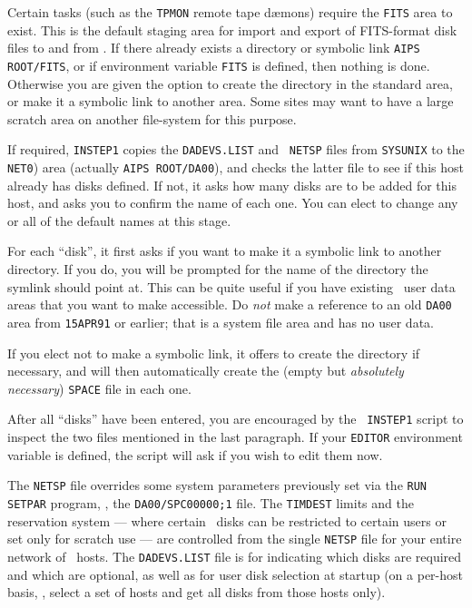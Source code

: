 Certain tasks (such as the {\tt TPMON} remote tape d\ae mons) require the
{\tt FITS} area to exist.  This is the default staging area for import and
export of FITS-format disk files to and from \ttaips.  If there already
exists a directory or symbolic link {\tt\dol AIPS ROOT/FITS}, or if
environment variable {\tt\dol FITS} is defined, then nothing is done.
Otherwise you are given the option to create the directory in the standard
area, or make it a symbolic link to another area.  Some sites may want to
have a large scratch area on another file-system for this purpose.

If required, {\tt INSTEP1} copies the {\tt DADEVS.LIST} and {\tt
NETSP} files from {\tt\dol SYSUNIX} to the {\tt\dol NET0}) area
(actually {\tt\dol AIPS ROOT/DA00}), and checks the latter file to
see if this host already has disks defined.  If not, it asks how many
disks are to be added for this host, and asks you to confirm the name of
each one.  You can elect to change any or all of the default names at this
stage.

For each ``disk'', it first asks if you want to make it a symbolic link
to another directory.  If you do, you will be prompted for the name of
the directory the symlink should point at.  This can be quite useful if
you have existing \AIPS\ user data areas that you want to make
accessible.  Do {\it not\/} make a reference to an old {\tt DA00} area
from {\tt 15APR91} or earlier; that is a system file area and has no
user data.

If you elect not to make a symbolic link, it offers to create the
directory if necessary, and will then automatically create the (empty
but {\it absolutely necessary\/}) {\tt SPACE} file in each one.

After all ``disks'' have been entered, you are encouraged by the {\tt
INSTEP1} script to inspect the two files mentioned in the last
paragraph.  If your {\tt\dol EDITOR} environment variable is defined, the
script will ask if you wish to edit them now.

The {\tt NETSP} file overrides some system parameters previously set via
the {\tt RUN SETPAR} program, \ie, the {\tt\dol DA00/SPC00000;1} file.
The {\tt TIMDEST} limits and the reservation system --- where certain
\AIPS\ disks can be restricted to certain users or set only for scratch
use --- are controlled from the single {\tt NETSP} file for your entire
network of \AIPS\ hosts.  The {\tt DADEVS.LIST} file is for indicating
which disks are required and which are optional, as well as for user disk
selection at startup (on a per-host basis, \ie, select a set of hosts and
get all disks from those hosts only).


